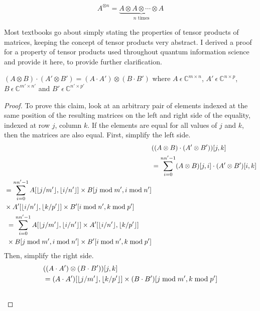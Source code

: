 $$A^{\otimes n} = \underbrace{A \otimes A \otimes \cdots \otimes A}_{n \text{ times}}$$

Most textbooks go about simply stating the properties of tensor products of matrices, keeping the concept of tensor products very abstract. I derived a proof for a property of tensor products used throughout quantum information science and provide it here, to provide further clarification.
\begin{theorem}
\label{theorem:tensorProducts1}
$(A \otimes B) \cdot (A' \otimes B') = (A \cdot A')\otimes(B \cdot B')$ where $A \ \epsilon \ \mathbb{C}^{m \times n}$, $A' \ \epsilon \ \mathbb{C}^{n \times p}$, $B \ \epsilon \ \mathbb{C}^{m' \times n'}$ and $B' \ \epsilon \ \mathbb{C}^{n' \times p'}$
\end{theorem}
\begin{proof}
To prove this claim, look at an arbitrary pair of elements indexed at the same position of the resulting matrices on the left and right side of the equality, indexed at row $j$, column $k$. If the elements are equal for all values of $j$ and $k$, then the matrices are also equal. First, simplify the left side.
\begin{align}
& ((A \otimes B)\cdot(A' \otimes B'))[j,k] \\
&= \sum_{i=0}^{nn'-1} (A \otimes B)[j,i]\cdot(A' \otimes B')[i,k] \\
\begin{split}
&= \sum_{i=0}^{nn'-1} A[\lfloor j/m'\rfloor,\lfloor i/n'\rfloor] \times B[j \bmod m', i \bmod n'] \\ 
&\times A'[\lfloor i/n'\rfloor,\lfloor k/p'\rfloor] \times B'[i \bmod n', k \bmod p'] \\
\end{split}\\
\begin{split}
&= \sum_{i=0}^{nn'-1} A[\lfloor j/m'\rfloor,\lfloor i/n'\rfloor] \times A'[\lfloor i/n'\rfloor,\lfloor k/p'\rfloor] \\ 
&\times B[j \bmod m', i \bmod n'] \times B'[i \bmod n', k \bmod p'] \\
\end{split} \label{equation:tp1LeftSide}
\end{align}
Then, simplify the right side.
\begin{align}
& ((A \cdot A')\otimes(B \cdot B'))[j,k] \\
&= (A \cdot A')[\floor{j / m'},\floor{k / p'}] \times(B \cdot B')[j \bmod m',k \bmod p'] \\
\begin{split}

\end{split}
\end{align}
\end{proof}
